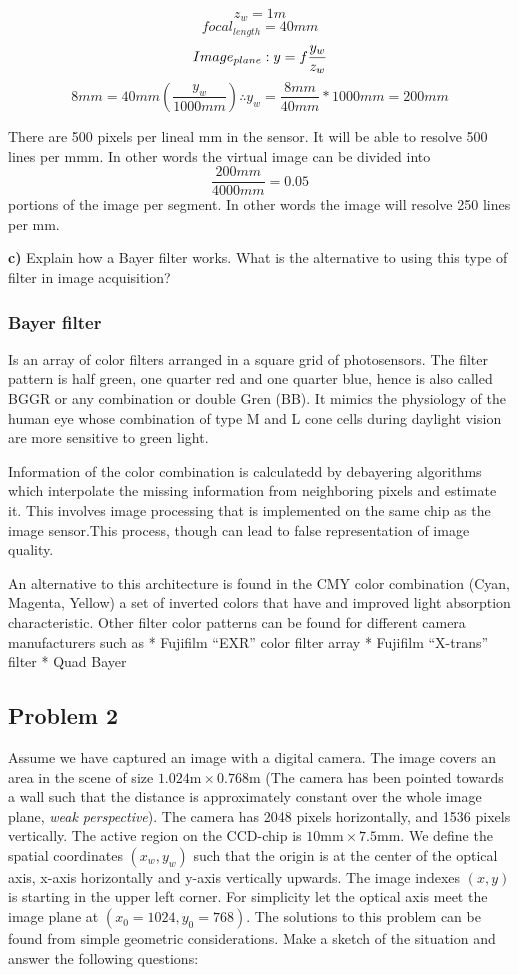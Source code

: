 \documentclass[border=1in]{standalone}
\begin{document}
\begin{minipage}{21cm}
\[z_w=1m\] \[focal_{length}=40mm\]
\[Image_{plane}: \space y=f\frac {y_w}{z_w} \]
\[8mm = 40mm (\frac{y_w}{1000mm}) \therefore y_w=\frac{8mm}{40mm}*1000mm=200mm\]

There are 500 pixels per lineal mm in the sensor. It will be able to
resolve 500 lines per mmm. In other words the virtual image can be
divided into \[\frac{200mm}{4000mm}=0.05\] portions of the image per
segment. In other words the image will resolve 250 lines per mm.

    \textbf{c)} Explain how a Bayer filter works. What is the alternative to
using this type of filter in image acquisition?

    \hypertarget{bayer-filter}{%
\subsubsection{Bayer filter}\label{bayer-filter}}

Is an array of color filters arranged in a square grid of photosensors.
The filter pattern is half green, one quarter red and one quarter blue,
hence is also called BGGR or any combination or double Gren (BB). It
mimics the physiology of the human eye whose combination of type M and L
cone cells during daylight vision are more sensitive to green light.

Information of the color combination is calculatedd by debayering
algorithms which interpolate the missing information from neighboring
pixels and estimate it. This involves image processing that is
implemented on the same chip as the image sensor.This process, though
can lead to false representation of image quality.

An alternative to this architecture is found in the CMY color
combination (Cyan, Magenta, Yellow) a set of inverted colors that have
and improved light absorption characteristic. Other filter color
patterns can be found for different camera manufacturers such as *
Fujifilm ``EXR'' color filter array * Fujifilm ``X-trans'' filter * Quad
Bayer

    \hypertarget{problem-2}{%
\subsection{Problem 2}\label{problem-2}}

Assume we have captured an image with a digital camera. The image covers
an area in the scene of size \(1.024\text{m} \times 0.768\text{m}\) (The
camera has been pointed towards a wall such that the distance is
approximately constant over the whole image plane, \emph{weak
perspective}). The camera has 2048 pixels horizontally, and 1536 pixels
vertically. The active region on the CCD-chip is
\(10\text{mm} \times 7.5\text{mm}\). We define the spatial coordinates
\((x_w,y_w)\) such that the origin is at the center of the optical axis,
x-axis horizontally and y-axis vertically upwards. The image indexes
\((x,y)\) is starting in the upper left corner. For simplicity let the
optical axis meet the image plane at \((x_{0}=1024,y_{0}=768)\). The
solutions to this problem can be found from simple geometric
considerations. Make a sketch of the situation and answer the following
questions:


\end{minipage}
\end{document}
